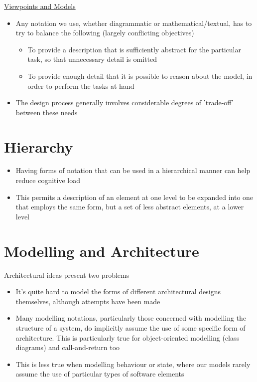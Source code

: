 \documentclass{article}[18pt]
\begin{document}
\begin{center}
\underline{\huge Viewpoints and Models}
\end{center}
\begin{itemize}
	\item Any notation we use, whether diagrammatic or mathematical/textual, has to try to balance the following (largely conflicting objectives)
	\begin{itemize}
		\item To provide a description that is sufficiently abstract for the particular task, so that unnecessary detail is omitted
		\item To provide enough detail that it is possible to reason about the model, in order to perform the tasks at hand
	\end{itemize} 
	\item The design process generally involves considerable degrees of 'trade-off' between these needs
\end{itemize}
\section{Hierarchy}
\begin{itemize}
	\item Having forms of notation that can be used in a hierarchical manner can help reduce cognitive load
	\item This permits a description of an element at one level to be expanded into one that employs the same form, but a set of less abstract elements, at a lower level
\end{itemize}
\section{Modelling and Architecture}
Architectural ideas present two problems
\begin{itemize}
	\item It's quite hard to model the forms of different architectural designs themselves, although attempts have been made
	\item Many modelling notations, particularly those concerned with modelling the structure of a system, do implicitly assume the use of some specific form of architecture. This is particularly true for object-oriented modelling (class diagrams) and call-and-return too
	\item This is less true when modelling behaviour or state, where our models rarely assume the use of particular types of software elements
\end{itemize}
\end{document}
